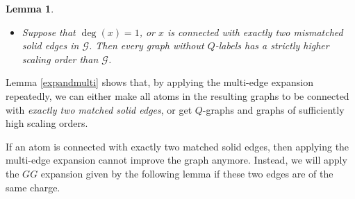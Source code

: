 \documentclass{article}
\newcommand{\1}{\mathds{1}}
\numberwithin{equation}{section}
\newcommand{\ord}{{\rm{ord}}}
\renewcommand{\cal}{\mathcal}
\renewcommand{\geq}{\geqslant}
\renewcommand{\ge}{\geq}
\theoremstyle{plain} %
\newtheorem{lemma}[theorem]{Lemma}
\theoremstyle{remark}
\begin{document}
\begin{lemma}
\begin{itemize}
\begin{itemize}
\end{itemize}
\item[(b)] %
Suppose that $\deg(x)=1$, or $x$ is connected with exactly two mismatched solid edges in $\cal G$. Then %
every graph without $Q$-labels has a strictly higher scaling order than $\cal G$.
\end{itemize}
  \end{lemma}
  

 Lemma \ref{expandmulti} shows that, by applying the multi-edge expansion repeatedly, we can either make all atoms in the resulting graphs to be connected with \emph{exactly two matched solid edges}, or get $Q$-graphs and graphs of sufficiently high scaling orders. 


If an atom is connected with exactly two matched solid edges, then applying the multi-edge expansion cannot improve the graph anymore. Instead, we will apply the $G G$ expansion given by the following lemma if these two edges are of the same charge.  
\end{document}
